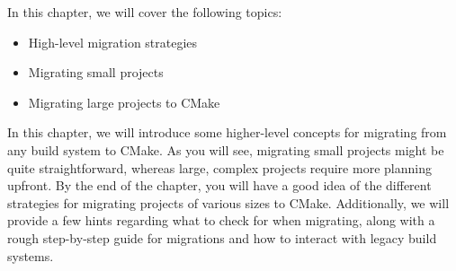 In this chapter, we will cover the following topics:

\begin{itemize}
\item 
High-level migration strategies

\item 
Migrating small projects

\item 
Migrating large projects to CMake
\end{itemize}

In this chapter, we will introduce some higher-level concepts for migrating from any build system to CMake. As you will see, migrating small projects might be quite straightforward, whereas large, complex projects require more planning upfront. By the end of the chapter, you will have a good idea of the different strategies for migrating projects of various sizes to CMake. Additionally, we will provide a few hints regarding what to check for when migrating, along with a rough step-by-step guide for migrations and how to interact with legacy build systems.